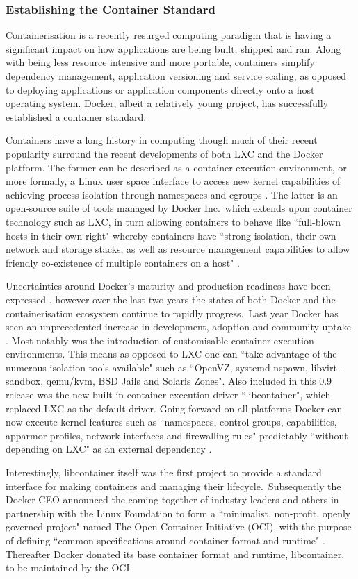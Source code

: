\documentclass{report}
\begin{document}
\subsubsection{Establishing the Container Standard}
Containerisation is a recently resurged computing paradigm that is
having a significant impact on how applications are being built,
shipped and ran. Along with being less resource intensive and
more portable, containers simplify dependency management, application
versioning and service scaling, as opposed to deploying
applications or application components directly onto a host operating
system. Docker, albeit a relatively young project, has successfully
established a container standard.
\par
Containers have a long history in computing though much of their recent popularity 
surround the recent developments of both LXC and the Docker platform. 
The former can be described as a container execution environment,
or more formally, a Linux user space interface to 
access new kernel capabilities of achieving process isolation through namespaces
and cgroups \citep{Claus}. The latter is an open-source suite of tools managed by Docker Inc.\ which
extends upon container technology such as LXC, in turn 
allowing containers to behave like ``full-blown hosts in their own right" 
whereby containers have ``strong isolation, their own network and storage stacks, as well 
as resource management capabilities to allow friendly co-existence of multiple containers on a host" \citep{db}.
\par 
Uncertainties around Docker's maturity and production-readiness have been expressed \citep{Kereki, Powers, Merkel}, however 
over the last two years the states of both Docker and the containerisation ecosystem continue to rapidly progress.\
Last year Docker has seen an unprecedented increase in development, adoption and community uptake \citep{Merkel}. Most
notably was the introduction of customisable container execution environments. This means as opposed to LXC one can
``take advantage of the numerous isolation tools available" such as ``OpenVZ, systemd-nspawn, libvirt-sandbox, qemu/kvm, BSD Jails and Solaris Zones".
Also included in this 0.9 release was the new built-in container execution driver ``libcontainer", which replaced LXC as the default driver.
Going forward on all platforms Docker can now execute kernel features such as ``namespaces, control groups, capabilities, apparmor profiles, 
network interfaces and firewalling rules" predictably ``without depending on LXC" as an external dependency \citep{Hykes}. 
\par
Interestingly, libcontainer itself was the first project to provide a standard interface for making containers and managing their lifecycle.\
Subsequently the Docker CEO  announced the coming together of industry leaders and others in partnership with the Linux Foundation
to form a ``minimalist, non-profit, openly governed project" named The Open Container Initiative (OCI), with the purpose of defining 
``common specifications around container format and runtime" \citep{Golub}. 
Thereafter Docker donated its base container format and runtime, libcontainer, to be maintained by the OCI. 
\end{document}
